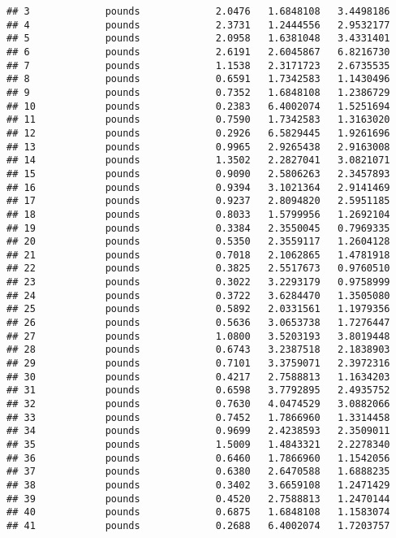 \documentclass[
]{article}
\begin{document}
\begin{verbatim}
## 3             pounds             2.0476   1.6848108   3.4498186
## 4             pounds             2.3731   1.2444556   2.9532177
## 5             pounds             2.0958   1.6381048   3.4331401
## 6             pounds             2.6191   2.6045867   6.8216730
## 7             pounds             1.1538   2.3171723   2.6735535
## 8             pounds             0.6591   1.7342583   1.1430496
## 9             pounds             0.7352   1.6848108   1.2386729
## 10            pounds             0.2383   6.4002074   1.5251694
## 11            pounds             0.7590   1.7342583   1.3163020
## 12            pounds             0.2926   6.5829445   1.9261696
## 13            pounds             0.9965   2.9265438   2.9163008
## 14            pounds             1.3502   2.2827041   3.0821071
## 15            pounds             0.9090   2.5806263   2.3457893
## 16            pounds             0.9394   3.1021364   2.9141469
## 17            pounds             0.9237   2.8094820   2.5951185
## 18            pounds             0.8033   1.5799956   1.2692104
## 19            pounds             0.3384   2.3550045   0.7969335
## 20            pounds             0.5350   2.3559117   1.2604128
## 21            pounds             0.7018   2.1062865   1.4781918
## 22            pounds             0.3825   2.5517673   0.9760510
## 23            pounds             0.3022   3.2293179   0.9758999
## 24            pounds             0.3722   3.6284470   1.3505080
## 25            pounds             0.5892   2.0331561   1.1979356
## 26            pounds             0.5636   3.0653738   1.7276447
## 27            pounds             1.0800   3.5203193   3.8019448
## 28            pounds             0.6743   3.2387518   2.1838903
## 29            pounds             0.7101   3.3759071   2.3972316
## 30            pounds             0.4217   2.7588813   1.1634203
## 31            pounds             0.6598   3.7792895   2.4935752
## 32            pounds             0.7630   4.0474529   3.0882066
## 33            pounds             0.7452   1.7866960   1.3314458
## 34            pounds             0.9699   2.4238593   2.3509011
## 35            pounds             1.5009   1.4843321   2.2278340
## 36            pounds             0.6460   1.7866960   1.1542056
## 37            pounds             0.6380   2.6470588   1.6888235
## 38            pounds             0.3402   3.6659108   1.2471429
## 39            pounds             0.4520   2.7588813   1.2470144
## 40            pounds             0.6875   1.6848108   1.1583074
## 41            pounds             0.2688   6.4002074   1.7203757

\end{verbatim}
\end{document}
